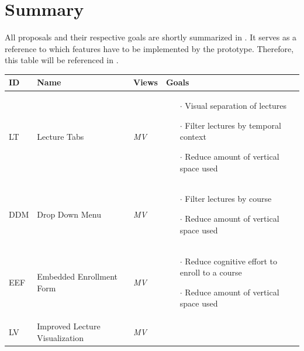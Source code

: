 \section{Summary}
All proposals and their respective goals are shortly summarized in . It serves as a reference to which features have to be implemented by the prototype. Therefore, this table will be referenced in .
\renewcommand*{\arraystretch}{1.5}
\begin{small}
	\begin{longtable}{ p{0.7cm} p{3.8cm} p{1cm} p{7.6cm}}
		\hline
		ID & Name & Views & Goals \\ \hline
		LT & Lecture Tabs & \emph{MV}& 
		\vspace{-0.45cm}
		\begin{itemize}[leftmargin=*, noitemsep, topsep=0pt,  partopsep=0pt]
			\item[$\cdot$] Visual separation of lectures
			\item[$\cdot$] Filter lectures by temporal context
			\item[$\cdot$] Reduce amount of vertical space used
		\end{itemize} \vspace{-0.45cm} \\ 
		DDM & Drop Down Menu & \emph{MV} & 
		\vspace{-0.45cm}
		\begin{itemize}[leftmargin=*, noitemsep, topsep=0pt]
			\item[$\cdot$] Filter lectures by course
			\item[$\cdot$] Reduce amount of vertical space used
		\end{itemize} \vspace{-0.45cm} \\ 
		EEF & Embedded Enrollment Form &\emph{MV} &
		\vspace{-0.45cm}
		\begin{itemize}[leftmargin=*, noitemsep, topsep=0pt]
			\item[$\cdot$] Reduce cognitive effort to enroll to a course
			\item[$\cdot$] Reduce amount of vertical space used
		\end{itemize} \vspace{-0.45cm} \\ 
		LV & Improved Lecture Visualization &\emph{MV} &
		\vspace{-0.45cm}	
		\begin{itemize}[leftmargin=*, noitemsep, topsep=0pt]

\end{itemize}
\end{longtable}
\end{small}
